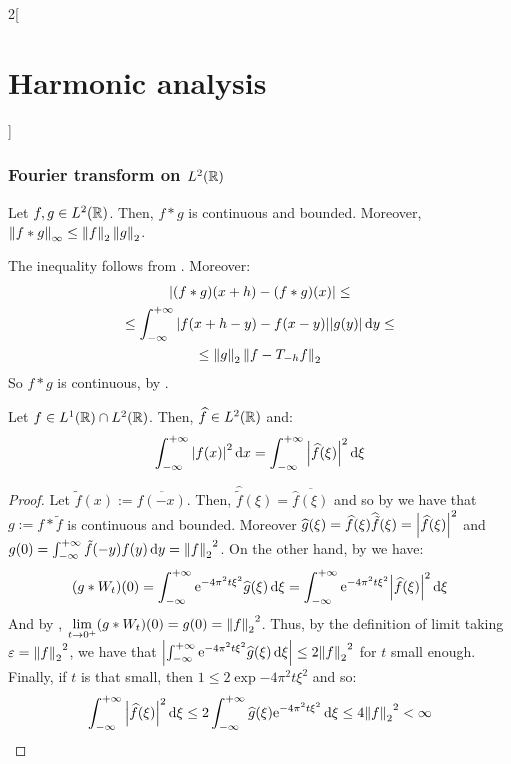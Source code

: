 \documentclass[../../../main_math.tex]{subfiles}
\begin{document}
\begin{multicols}{2}[\section{Harmonic analysis}]
  \subsubsection{Fourier transform on \texorpdfstring{$L^2(\mathbb{R})$}{L2(R)}}
  \begin{lemma}\label{HA:lemaPrePlancherel}
    Let $f,g\in L^2(\mathbb{R})$. Then, $f*g$ is continuous and bounded. Moreover, $\left\|f*g\right\|_\infty\leq \left\|f\right\|_2\left\|g\right\|_2$.
  \end{lemma}
  \begin{sproof}
    The inequality follows from . Moreover:
    \begin{multline*}
      \abs{(f*g)(x+h)-(f*g)(x)} \leq\\
      \leq\int_{-\infty}^{+\infty}\abs{f(x+h-y)-f(x-y)}\abs{g(y)}\dd{y}\leq\\
      \leq\left\|g\right\|_2\left\|f-T_{-h}f\right\|_2
    \end{multline*}
    So $f*g$ is continuous, by .
  \end{sproof}
  \begin{theorem}\label{HA:plancherel}
    Let $f\in L^1(\mathbb{R})\cap L^2(\mathbb{R})$. Then, $\widehat{f}\in L^2(\mathbb{R})$ and:
    $$\int_{-\infty}^{+\infty}\abs{f(x)}^2\dd{x}=\int_{-\infty}^{+\infty}\abs{\widehat{f}(\xi)}^2\dd{\xi}$$
  \end{theorem}
  \begin{proof}
    Let $\tilde{f}(x):=\overline{f(-x)}$. Then, $\widehat{\tilde{f}}(\xi)=\overline{\widehat{f}(\xi)}$ and so by  we have that $g:=f*\tilde{f}$ is continuous and bounded. Moreover $\widehat{g}(\xi)=\widehat{f}(\xi)\widehat{\tilde{f}}(\xi)=\abs{\widehat{f}(\xi)}^2$ and $g(0)=\int_{-\infty}^{+\infty}\tilde{f}(-y)f(y)\dd{y}={\left\|f\right\|_2}^2$. On the other hand, by  we have:
    \begin{equation}\label{HA:planchEq}
      (g*W_t)(0)=\int_{-\infty}^{+\infty}\mathrm{e}^{-4\pi^2 t\xi^2}\widehat{g}(\xi)\dd{\xi}=\int_{-\infty}^{+\infty}\mathrm{e}^{-4\pi^2 t\xi^2}\abs{\widehat{f}(\xi)}^2\dd{\xi}
    \end{equation}
    And by , $\displaystyle\lim_{t\to 0^+}(g*W_t)(0)=g(0)={\left\|f\right\|_2}^2$. Thus, by the definition of limit taking $\varepsilon = {\left\|f\right\|_2}^2$, we have that $\abs{\int_{-\infty}^{+\infty}\mathrm{e}^{-4\pi^2 t\xi^2}\widehat{g}(\xi)\dd{\xi}}\leq 2{\left\|f\right\|_2}^2$ for $t$ small enough. Finally, if $t$ is that small, then $1\leq 2\exp{-4\pi^2 t\xi^2}$ and so:
    $$\int_{-\infty}^{+\infty}\abs{\widehat{f}(\xi)}^2\dd{\xi}\leq 2\int_{-\infty}^{+\infty}\widehat{g}(\xi)\mathrm{e}^{-4\pi^2 t\xi^2}\dd{\xi}\leq 4{\left\|f\right\|_2}^2<\infty$$

\end{proof}
\end{multicols}
\end{document}
